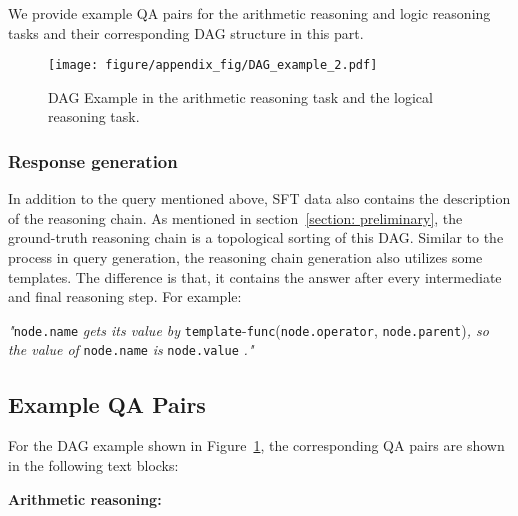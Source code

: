 \label{subsection: example-qa-pairs}
We provide example QA pairs for the arithmetic reasoning and logic reasoning tasks and their corresponding DAG structure in this part.
\begin{figure}[t]
    \centering
    \texttt{[image: figure/appendix\_fig/DAG\_example\_2.pdf]}
    \caption{DAG Example in the arithmetic reasoning task and the logical reasoning task.}
    \label{fig: DAG_math_example}
\end{figure}

\subsubsection{Response generation}
In addition to the query mentioned above, SFT data also contains the description of the reasoning chain. As mentioned in section~\ref{section: preliminary}, the ground-truth reasoning chain is a topological sorting of this DAG. Similar to the process in query generation, the reasoning chain generation also utilizes some templates. The difference is that, it contains the answer after every intermediate and final reasoning step. For example:

\begin{tcolorbox}[colback=blue!2!white, colframe=blue!80!black, boxrule=0.5pt]
\small
\textit{"}\texttt{node.name} \textit{gets its value by}  \texttt{template}-\texttt{func}(\texttt{node.operator}, \texttt{node.parent})\textit{, so the value of} \texttt{node.name} \textit{is} \texttt{node.value} \textit{."}
\end{tcolorbox}

\subsection{Example QA Pairs}
\label{subsection:appendix-example-QA-pairs}

For the DAG example shown in Figure~\ref{fig: DAG_math_example}, the corresponding QA pairs are shown in the following text blocks:



\textbf{Arithmetic reasoning:}

